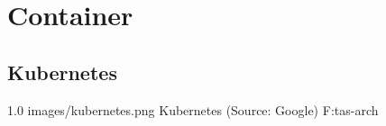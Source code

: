 \chapter{Container}

\FILENAME

\section{Kubernetes}

    {1.0}
    {images/kubernetes.png}
    {Kubernetes (Source: Google)}
    {F:tas-arch} 
